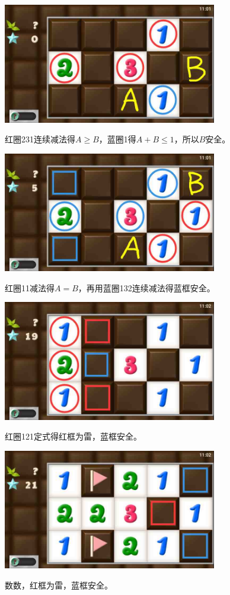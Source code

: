 \subsection{} %
\begin{center}
    \includegraphics[width=0.7\textwidth]{puzzlelow/184-1.jpg}
\end{center}
红圈231连续减法得$A\ge B$，蓝圈1得$A+B\le 1$，所以$B$安全。
\begin{center}
    \includegraphics[width=0.7\textwidth]{puzzlelow/184-2.jpg}
\end{center}
红圈11减法得$A=B$，再用蓝圈132连续减法得蓝框安全。
\begin{center}
    \includegraphics[width=0.7\textwidth]{puzzlelow/184-3.jpg}
\end{center}
红圈121定式得红框为雷，蓝框安全。
\begin{center}
    \includegraphics[width=0.7\textwidth]{puzzlelow/184-4.jpg}
\end{center}
数数，红框为雷，蓝框安全。

